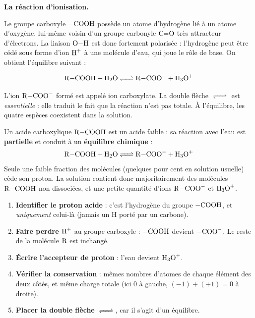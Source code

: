 \documentclass[11pt]{article}
\newcommand{\cle}[1]{{\popxbold\color{popdark}#1}}
\begin{document}
\textbf{La réaction d'ionisation.}\par
Le groupe carboxyle $-\ce{COOH}$ possède un atome d'hydrogène lié à un atome d'oxygène, lui-même voisin d'un groupe carbonyle $\ce{C=O}$ très attracteur d'électrons. La liaison $\ce{O-H}$ est donc fortement polarisée : l'hydrogène peut être cédé sous forme d'ion $\ce{H+}$ à une molécule d'eau, qui joue le rôle de base. On obtient l'équilibre suivant :

\[ \ce{R-COOH + H2O <=> R-COO- + H3O+} \]

L'ion $\ce{R-COO-}$ formé est appelé ion \cle{carboxylate}. La double flèche $\ce{<=>}$ est \emph{essentielle} : elle traduit le fait que la réaction n'est pas totale. À l'équilibre, les quatre espèces coexistent dans la solution.

\begin{definition}
Un acide carboxylique $\ce{R-COOH}$ est un \cle{acide faible} : sa réaction avec l'eau est \textbf{partielle} et conduit à un \textbf{équilibre chimique} :
\[ \ce{R-COOH + H2O <=> R-COO- + H3O+} \]
Seule une faible fraction des molécules (quelques pour cent en solution usuelle) cède son proton. La solution contient donc majoritairement des molécules $\ce{R-COOH}$ non dissociées, et une petite quantité d'ions $\ce{R-COO-}$ et $\ce{H3O+}$.
\end{definition}

\begin{methode}
\begin{enumerate}
\item \textbf{Identifier le proton acide} : c'est l'hydrogène du groupe $-\ce{COOH}$, et \emph{uniquement} celui-là (jamais un H porté par un carbone).
\item \textbf{Faire perdre $\ce{H+}$} au groupe carboxyle : $-\ce{COOH}$ devient $-\ce{COO-}$. Le reste de la molécule $\ce{R}$ est inchangé.
\item \textbf{Écrire l'accepteur de proton} : l'eau devient $\ce{H3O+}$.
\item \textbf{Vérifier la conservation} : mêmes nombres d'atomes de chaque élément des deux côtés, et même charge totale (ici $0$ à gauche, $(-1)+(+1)=0$ à droite).
\item \textbf{Placer la double flèche} $\ce{<=>}$, car il s'agit d'un équilibre.
\end{enumerate}
\end{methode}
\end{document}
